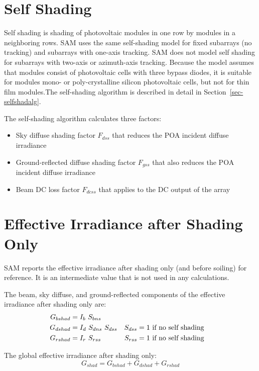 \documentclass[12pt,letterpaper]{article}
\begin{document}
\section{Self Shading}\label{sec-selfshad}

Self shading is shading of photovoltaic modules in one row by modules in a neighboring rows. SAM uses the same self-shading model for fixed subarrays (no tracking) and subarrays with one-axis tracking. SAM does not model self shading for subarrays with two-axis or azimuth-axis tracking. Because the model assumes that modules consist of photovoltaic cells with three bypass diodes, it is suitable for modules mono- or poly-crystalline silicon photovoltaic cells, but not for thin film modules.The self-shading algorithm is described in detail in Section~\ref{sec-selfshadalg}.

The self-shading algorithm calculates three factors:
\begin{itemize}
\item Sky diffuse shading factor $F_{dss}$ that reduces the POA incident diffuse irradiance
\item Ground-reflected diffuse shading factor $F_{gss}$ that also reduces the POA incident diffuse irradiance
\item Beam DC loss factor $F_{dcss}$ that applies to the DC output of the array
\end{itemize}

\section{Effective Irradiance after Shading Only}

SAM reports the effective irradiance after shading only (and before soiling) for reference. It is an intermediate value that is not used in any calculations.

The beam, sky diffuse, and ground-reflected components of the effective irradiance after shading only are:
\begin{align}
G_{bshad} &= I_b~S_{bns}\notag\\
G_{dshad} &= I_d~S_{dns}~S_{dss} & S_{dss}&=1 ~\text{if no self shading} \notag\\
G_{rshad} &= I_r~S_{rss} & S_{rss}&=1 ~\text{if no self shading}
\end{align}

The global effective irradiance after shading only:
\begin{equation}
G_{shad} = G_{bshad} + G_{dshad} + G_{rshad}
\end{equation}
\end{document}
